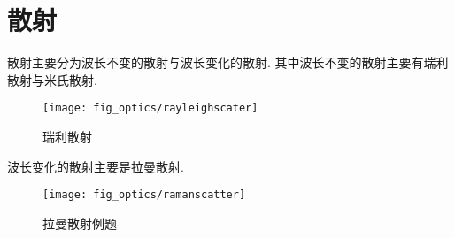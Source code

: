 \documentclass[a4paper]{article}
\begin{document}
	\section{散射}
	散射主要分为波长不变的散射与波长变化的散射. 其中波长不变的散射主要有瑞利散射与米氏散射.
	\begin{figure}[H]
		\centering
		\texttt{[image: fig\_optics/rayleighscater]}
		\caption{瑞利散射}
		\label{fig:rayleighscater}
	\end{figure}
	波长变化的散射主要是拉曼散射.
	\begin{framed}
		\begin{figure}[H]
			\centering
			\texttt{[image: fig\_optics/ramanscatter]}
			\caption{拉曼散射例题}
			\label{fig:ramanscatter}
		\end{figure}
		
	\end{framed}
\end{document}
